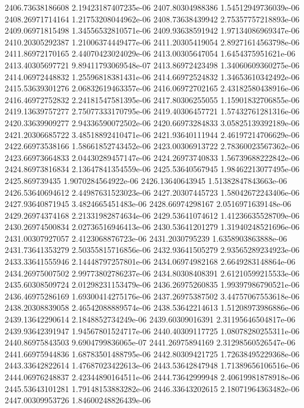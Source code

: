 {2406.73638186608 2.19423187407235e-06
2407.80304988386 1.54512949736039e-06
2408.26971714164 1.21753208044962e-06
2408.73638439942 2.75357757218893e-06
2409.06971815498 1.34556532810571e-06
2409.93638591942 1.97134086969347e-06
2410.20305292387 1.21006374449477e-06
2411.20305419054 2.89271614563798e-06
2411.86972170165 2.44070423024029e-06
2413.00305647054 1.6454375951621e-06
2413.40305697721 9.89411793069548e-07
2413.86972423498 1.34060609360275e-06
2414.06972448832 1.25596818381431e-06
2414.66972524832 1.34653610342492e-06
2415.53639301276 2.06832619463357e-06
2416.06972702165 2.43182580438916e-06
2416.46972752832 2.24181547581395e-06
2417.80306255055 1.15901832706855e-06
2419.13639757277 2.75077333170795e-06
2419.40306457721 1.57432761281316e-06
2420.33639909277 2.94336590072502e-06
2420.66973284833 3.05825139392189e-06
2421.20306685722 3.48518892410471e-06
2421.93640111944 2.46197214706629e-06
2422.66973538166 1.58661852743452e-06
2423.00306913722 2.78360023567362e-06
2423.66973664833 2.04430289457147e-06
2424.26973740833 1.56739688222842e-06
2424.86973816834 2.13647841354559e-06
2425.53640567945 1.98462213077495e-06
2425.869739435 1.9070284564922e-06
2426.13640643945 1.51382847843663e-06
2426.53640694612 2.44987631523023e-06
2427.20307445723 1.58042672243406e-06
2427.93640871945 3.4824665451483e-06
2428.66974298167 2.0516971639148e-06
2429.26974374168 2.21331982874634e-06
2429.53641074612 1.41236635528709e-06
2430.26974500834 2.02736516946413e-06
2430.53641201279 1.31940248521696e-06
2431.00307927057 2.4123068876723e-06
2431.2030795239 1.6358903863888e-06
2431.73641353279 2.50355815716856e-06
2432.93641505279 2.93565289234923e-06
2433.33641555946 2.14448797257801e-06
2434.06974982168 2.6649283148864e-06
2434.26975007502 2.99773802786237e-06
2434.80308408391 2.61210599215533e-06
2435.60308509724 2.01298231153479e-06
2436.26975260835 1.99397986790521e-06
2436.46975286169 1.69300414275176e-06
2437.26975387502 3.44757067553618e-06
2438.20308839058 2.46542088889574e-06
2438.53642214613 1.51208973986886e-06
2439.13642290614 2.1848852734249e-06
2439.60309016391 2.31195646504817e-06
2439.93642391947 1.94567801524717e-06
2440.40309117725 1.08078280255311e-06
2440.86975843503 9.6904799836065e-07
2441.26975894169 2.31298560526547e-06
2441.66975944836 1.68783501488795e-06
2442.80309421725 1.72638495229368e-06
2443.33642822614 1.47687023422613e-06
2443.53642847948 1.71389656106516e-06
2444.06976248837 2.42344890164511e-06
2444.73642999948 2.40619981878918e-06
2445.53643101281 1.79148153883282e-06
2446.33643202615 2.18071964363482e-06
2447.00309953726 1.84600248826439e-06
}
